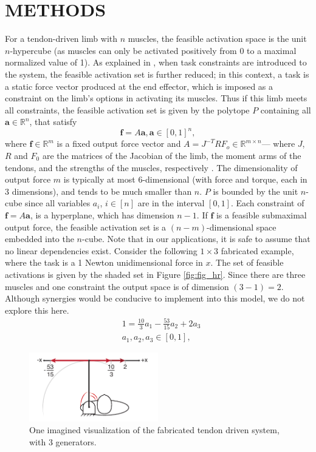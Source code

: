 \section{METHODS}
\label{s:methods}
For a tendon-driven limb with $n$ muscles, the feasible activation space is the unit $n$-hypercube (as muscles can only be activated positively from 0 to a maximal normalized value of 1). As explained in \cite{Valero-Cuevas2009mathematical}, when task constraints are introduced to the system, the feasible activation set is further reduced; in this context, a task is a static force vector produced at the end effector, which is imposed as a constraint on the limb's options in activating its muscles. Thus if this limb meets all constraints, the feasible activation set is given by the polytope $P$ containing all $\textbf{a} \in \mathbb{R}^n$, that satisfy
\[\textbf{f} = A\textbf{a}, \textbf{a} \in [0,1]^n,\]
where $\textbf{f} \in \mathbb{R}^m$ is a fixed output force vector and $A = J^{-T}RF_o \in \mathbb{R}^{m \times n}$--- where $J$, $R$ and $F_0$ are the matrices of the Jacobian of the limb, the moment arms of the tendons, and the strengths of the muscles, respectively \cite{Valero-Cuevas1998Large,Valero-Cuevas2009mathematical}.
The dimensionality of output force $m$ is typically at most 6-dimensional (with force and torque, each in 3 dimensions), and tends to be much smaller than $n$.
$P$ is bounded by the unit $n$-cube since all variables $a_i$, $i \in [n]$ are in the interval $[0,1]$. Each constraint of $\textbf{f}= A \textbf{a}$, is a hyperplane, which has dimension $n-1$.
If $\textbf{f}$ is a feasible submaximal output force, the feasible activation set is a $(n-m)$-dimensional space embedded into the $n$-cube.
Note that in our applications, it is safe to assume that no linear dependencies exist.
Consider the following $1 \times 3$ fabricated example, where the task is a 1 Newton unidimensional force in $x$. The set of feasible activations is given by the shaded set in Figure \ref{fig:fig_hr}. Since there are three muscles and one constraint the output space is of dimension $(3-1) = 2$.
Although synergies would be conducive to implement into this model, we do not explore this here.
\begin{align*}
&1 = \frac{10}{3}a_1 - \frac{53}{15}a_2 + 2a_3 \\
&a_1, a_2, a_3 \in [0,1],
\end{align*}

\begin{figure}[schematic_arm]
  \label{fig:schematic_arm}
  \centering
  \includegraphics[width=0.5\textwidth]{figs/schematic_arm_1D.pdf}
  \caption{One imagined visualization of the fabricated tendon driven system, with 3 generators.}
  \label{fig:finger}
\end{figure}


